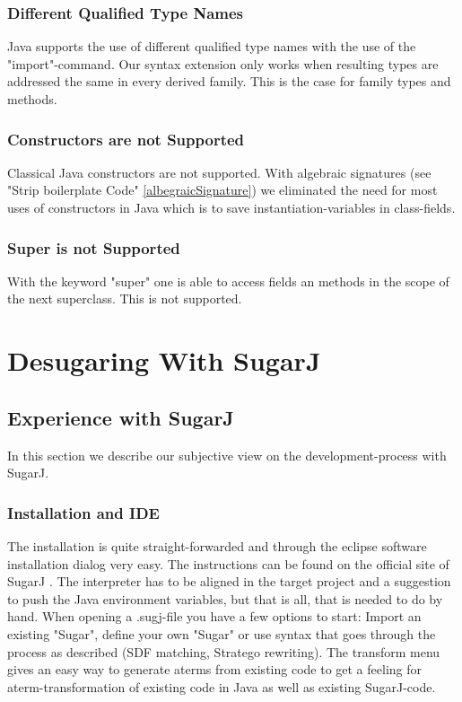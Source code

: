 \documentclass{report}
\begin{document}
\subsection{Different Qualified Type Names}

Java supports the use of different qualified type names with the use of the "import"-command. Our syntax extension only works when resulting types are addressed the same in every derived family. This is the case for family types and methods.

\subsection{Constructors are not Supported}

Classical Java constructors are not supported. With algebraic signatures (see "Strip boilerplate Code" \ref{albegraicSignature}) we eliminated the need for most uses of constructors in Java which is to save instantiation-variables in class-fields.

\subsection{Super is not Supported}

With the keyword "super" one is able to access fields an methods in the scope of the next superclass. This is not supported.

\chapter{Desugaring With SugarJ}
\label{sugarJChapter}

\section{Experience with SugarJ}
In this section we describe our subjective view on the development-process with SugarJ.

\subsection{Installation and IDE}
The installation is quite straight-forwarded and through the eclipse software installation dialog very easy. The instructions can be found on the official site of SugarJ \cite{SugarJ-Homepage}. The interpreter has to be aligned in the target project and a suggestion to push the Java environment variables, but that is all, that is needed to do by hand. When opening a .sugj-file you have a few options to start: Import an existing "Sugar", define your own "Sugar" or use syntax that goes through the process as described (SDF matching, Stratego rewriting). The transform menu gives an easy way to generate aterms from existing code to get a feeling for aterm-transformation of existing code in Java as well as existing SugarJ-code.
\end{document}
